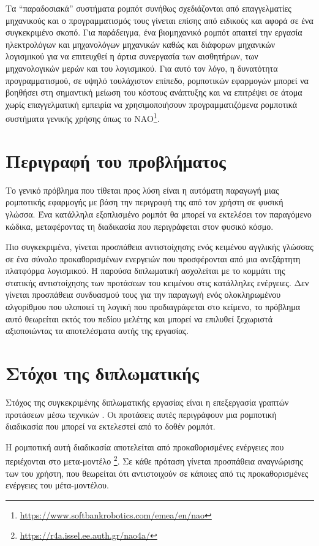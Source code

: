 Τα \enquote{παραδοσιακά} συστήματα ρομπότ συνήθως σχεδιάζονται από επαγγελματίες μηχανικούς και ο προγραμματισμός τους γίνεται επίσης από ειδικούς και αφορά σε ένα συγκεκριμένο σκοπό.
Για παράδειγμα, ένα βιομηχανικό ρομπότ απαιτεί την εργασία ηλεκτρολόγων και μηχανολόγων μηχανικών καθώς και διάφορων μηχανικών λογισμικού για να επιτευχθεί η άρτια συνεργασία των αισθητήρων, των μηχανολογικών μερών και του λογισμικού.
Για αυτό τον λόγο, η δυνατότητα προγραμματισμού, σε υψηλό τουλάχιστον επίπεδο, ρομποτικών εφαρμογών μπορεί να βοηθήσει στη σημαντική μείωση του κόστους ανάπτυξης και να επιτρέψει σε άτομα χωρίς επαγγελματική εμπειρία να χρησιμοποιήσουν προγραμματιζόμενα ρομποτικά συστήματα γενικής χρήσης όπως το NAO\footnote{\url{https://www.softbankrobotics.com/emea/en/nao}}.

\section{Περιγραφή του προβλήματος}\label{sec:problem-description}
Το γενικό πρόβλημα που τίθεται προς λύση είναι η αυτόματη παραγωγή μιας ρομποτικής εφαρμογής με βάση την περιγραφή της από τον χρήστη σε φυσική γλώσσα.
Ένα κατάλληλα εξοπλισμένο ρομπότ θα μπορεί να εκτελέσει τον παραγόμενο κώδικα, μεταφέροντας τη διαδικασία που περιγράφεται στον φυσικό κόσμο.

Πιο συγκεκριμένα, γίνεται προσπάθεια αντιστοίχησης ενός κειμένου αγγλικής γλώσσας σε ένα σύνολο προκαθορισμένων ενεργειών που προσφέρονται από μια ανεξάρτητη πλατφόρμα λογισμικού.
Η παρούσα διπλωματική ασχολείται με το κομμάτι της στατικής αντιστοίχησης των προτάσεων του κειμένου στις κατάλληλες ενέργειες.
Δεν γίνεται προσπάθεια συνδυασμού τους για την παραγωγή ενός ολοκληρωμένου αλγορίθμου που υλοποιεί τη λογική που προδιαγράφεται στο κείμενο,
το πρόβλημα αυτό θεωρείται εκτός του πεδίου μελέτης και μπορεί να επιλυθεί ξεχωριστά αξιοποιώντας τα αποτελέσματα αυτής της εργασίας.

\section{Στόχοι της διπλωματικής}\label{sec:diploma-purpose}
Στόχος της συγκεκριμένης διπλωματικής εργασίας είναι η επεξεργασία γραπτών προτάσεων μέσω τεχνικών
.
Οι προτάσεις αυτές περιγράφουν μια ρομποτική διαδικασία που μπορεί να εκτελεστεί από το δοθέν ρομπότ.

Η ρομποτική αυτή διαδικασία αποτελείται από προκαθορισμένες ενέργειες που περιέχονται στο μετα-μοντέλο \metamodel{}\footnote{\url{https://r4a.issel.ee.auth.gr/nao4a/}}.
Σε κάθε πρόταση γίνεται προσπάθεια αναγνώρισης των  του χρήστη,
που θεωρείται ότι αντιστοιχούν σε κάποιες από τις προκαθορισμένες ενέργειες του μέτα-μοντέλου.

